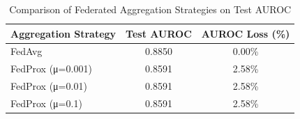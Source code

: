 \begin{table}[h!]
\centering
\caption{Comparison of Federated Aggregation Strategies on Test AUROC}
\label{tab:aggregation}
\begin{tabular}{lcc}
\toprule
\textbf{Aggregation Strategy} & \textbf{Test AUROC} & \textbf{AUROC Loss (\%)} \\
\midrule
FedAvg & 0.8850 & 0.00\% \\
FedProx (μ=0.001) & 0.8591 & 2.58\% \\
FedProx (μ=0.01) & 0.8591 & 2.58\% \\
FedProx (μ=0.1) & 0.8591 & 2.58\% \\
\bottomrule
\end{tabular}
\end{table}
